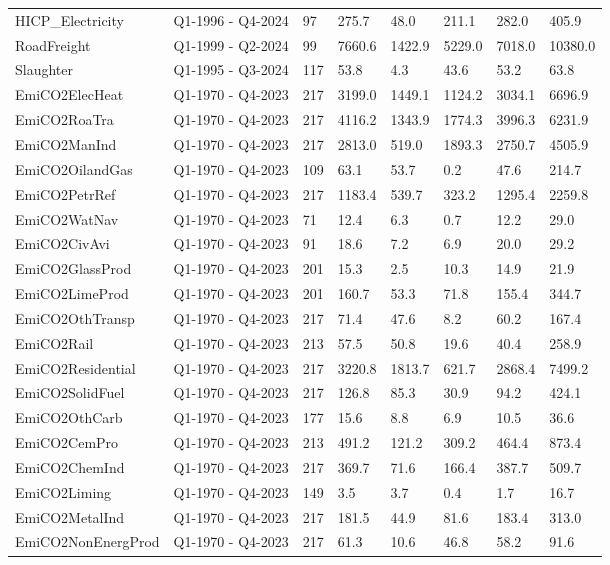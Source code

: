 \begin{longtable}[t]{llllllll}
\addlinespace
HICP\_Electricity & Q1-1996 - Q4-2024 & 97 & 275.7 & 48.0 & 211.1 & 282.0 & 405.9\\
RoadFreight & Q1-1999 - Q2-2024 & 99 & 7660.6 & 1422.9 & 5229.0 & 7018.0 & 10380.0\\
Slaughter & Q1-1995 - Q3-2024 & 117 & 53.8 & 4.3 & 43.6 & 53.2 & 63.8\\
EmiCO2ElecHeat & Q1-1970 - Q4-2023 & 217 & 3199.0 & 1449.1 & 1124.2 & 3034.1 & 6696.9\\
EmiCO2RoaTra & Q1-1970 - Q4-2023 & 217 & 4116.2 & 1343.9 & 1774.3 & 3996.3 & 6231.9\\
\addlinespace
EmiCO2ManInd & Q1-1970 - Q4-2023 & 217 & 2813.0 & 519.0 & 1893.3 & 2750.7 & 4505.9\\
EmiCO2OilandGas & Q1-1970 - Q4-2023 & 109 & 63.1 & 53.7 & 0.2 & 47.6 & 214.7\\
EmiCO2PetrRef & Q1-1970 - Q4-2023 & 217 & 1183.4 & 539.7 & 323.2 & 1295.4 & 2259.8\\
EmiCO2WatNav & Q1-1970 - Q4-2023 & 71 & 12.4 & 6.3 & 0.7 & 12.2 & 29.0\\
EmiCO2CivAvi & Q1-1970 - Q4-2023 & 91 & 18.6 & 7.2 & 6.9 & 20.0 & 29.2\\
\addlinespace
EmiCO2GlassProd & Q1-1970 - Q4-2023 & 201 & 15.3 & 2.5 & 10.3 & 14.9 & 21.9\\
EmiCO2LimeProd & Q1-1970 - Q4-2023 & 201 & 160.7 & 53.3 & 71.8 & 155.4 & 344.7\\
EmiCO2OthTransp & Q1-1970 - Q4-2023 & 217 & 71.4 & 47.6 & 8.2 & 60.2 & 167.4\\
EmiCO2Rail & Q1-1970 - Q4-2023 & 213 & 57.5 & 50.8 & 19.6 & 40.4 & 258.9\\
EmiCO2Residential & Q1-1970 - Q4-2023 & 217 & 3220.8 & 1813.7 & 621.7 & 2868.4 & 7499.2\\
\addlinespace
EmiCO2SolidFuel & Q1-1970 - Q4-2023 & 217 & 126.8 & 85.3 & 30.9 & 94.2 & 424.1\\
EmiCO2OthCarb & Q1-1970 - Q4-2023 & 177 & 15.6 & 8.8 & 6.9 & 10.5 & 36.6\\
EmiCO2CemPro & Q1-1970 - Q4-2023 & 213 & 491.2 & 121.2 & 309.2 & 464.4 & 873.4\\
EmiCO2ChemInd & Q1-1970 - Q4-2023 & 217 & 369.7 & 71.6 & 166.4 & 387.7 & 509.7\\
EmiCO2Liming & Q1-1970 - Q4-2023 & 149 & 3.5 & 3.7 & 0.4 & 1.7 & 16.7\\
\addlinespace
EmiCO2MetalInd & Q1-1970 - Q4-2023 & 217 & 181.5 & 44.9 & 81.6 & 183.4 & 313.0\\
EmiCO2NonEnergProd & Q1-1970 - Q4-2023 & 217 & 61.3 & 10.6 & 46.8 & 58.2 & 91.6\\

\end{longtable}
